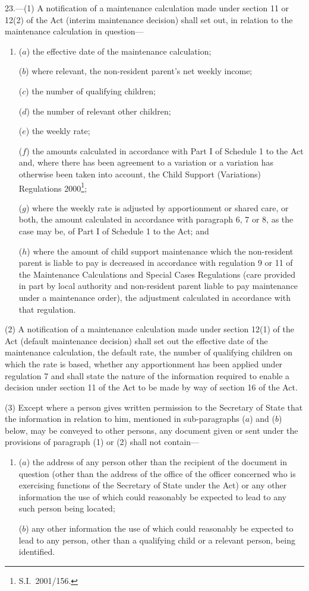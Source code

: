 \documentclass[12pt,a4paper]{article}
\begin{document}
23.---(1)  A notification of a maintenance calculation made under section 11 or 12(2) of the Act (interim maintenance decision) shall set out, in relation to the maintenance calculation in question—
\begin{enumerate}\item[]
($a$) the effective date of the maintenance calculation;

($b$) where relevant, the non-resident parent’s net weekly income;

($c$) the number of qualifying children;

($d$) the number of relevant other children;

($e$) the weekly rate;

($f$) the amounts calculated in accordance with Part I of Schedule 1 to the Act and, where there has been agreement to a variation or a variation has otherwise been taken into account, the Child Support (Variations) Regulations 2000\footnote{S.I.\ 2001/156.};

($g$) where the weekly rate is adjusted by apportionment or shared care, or both, the amount calculated in accordance with paragraph 6, 7 or 8, as the case may be, of Part I of Schedule 1 to the Act; and

($h$) where the amount of child support maintenance which the non-resident parent is liable to pay is decreased in accordance with regulation 9 or 11 of the Maintenance Calculations and Special Cases Regulations (care provided in part by local authority and non-resident parent liable to pay maintenance under a maintenance order), the adjustment calculated in accordance with that regulation.
\end{enumerate}

(2) A notification of a maintenance calculation made under section 12(1) of the Act (default maintenance decision) shall set out the effective date of the maintenance calculation, the default rate, the number of qualifying children on which the rate is based, whether any apportionment has been applied under regulation 7 and shall state the nature of the information required to enable a decision under section 11 of the Act to be made by way of section 16 of the Act.

(3) Except where a person gives written permission to the Secretary of State that the information in relation to him, mentioned in sub-paragraphs ($a$)  and ($b$)  below, may be conveyed to other persons, any document given or sent under the provisions of paragraph (1) or (2) shall not contain—
\begin{enumerate}\item[]
($a$) the address of any person other than the recipient of the document in question (other than the address of the office of the officer concerned who is exercising functions of the Secretary of State under the Act) or any other information the use of which could reasonably be expected to lead to any such person being located;

($b$) any other information the use of which could reasonably be expected to lead to any person, other than a qualifying child or a relevant person, being identified.
\end{enumerate}
\end{document}
